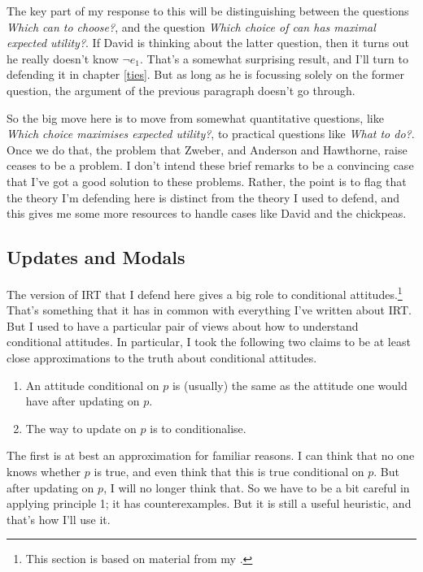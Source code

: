 \documentclass[11pt,]{book}
\providecommand{\tightlist}{%
  \setlength{\itemsep}{0pt}\setlength{\parskip}{0pt}}
\let\rmarkdownfootnote\footnote%
\def\footnote{\protect\rmarkdownfootnote}
\begin{document}
The key part of my response to this will be distinguishing between the questions \emph{Which can to choose?}, and the question \emph{Which choice of can has maximal expected utility?}. If David is thinking about the latter question, then it turns out he really doesn't know \(\neg e_1\). That's a somewhat surprising result, and I'll turn to defending it in chapter \ref{ties}. But as long as he is focussing solely on the former question, the argument of the previous paragraph doesn't go through.

So the big move here is to move from somewhat quantitative questions, like \emph{Which choice maximises expected utility?}, to practical questions like \emph{What to do?}. Once we do that, the problem that Zweber, and Anderson and Hawthorne, raise ceases to be a problem. I don't intend these brief remarks to be a convincing case that I've got a good solution to these problems. Rather, the point is to flag that the theory I'm defending here is distinct from the theory I used to defend, and this gives me some more resources to handle cases like David and the chickpeas.

\hypertarget{modalupdate}{%
\subsection{Updates and Modals}\label{modalupdate}}

The version of IRT that I defend here gives a big role to conditional attitudes.\footnote{This section is based on material from my \citeyearpar[sect. 1]{Weatherson2016}.} That's something that it has in common with everything I've written about IRT. But I used to have a particular pair of views about how to understand conditional attitudes. In particular, I took the following two claims to be at least close approximations to the truth about conditional attitudes.

\begin{enumerate}
\def\labelenumi{\arabic{enumi}.}
\tightlist
\item
  An attitude conditional on \(p\) is (usually) the same as the attitude one would have after updating on \(p\).
\item
  The way to update on \(p\) is to conditionalise.
\end{enumerate}

The first is at best an approximation for familiar reasons. I can think that no one knows whether \(p\) is true, and even think that this is true conditional on \(p\). But after updating on \(p\), I will no longer think that. So we have to be a bit careful in applying principle 1; it has counterexamples. But it is still a useful heuristic, and that's how I'll use it.
\end{document}
